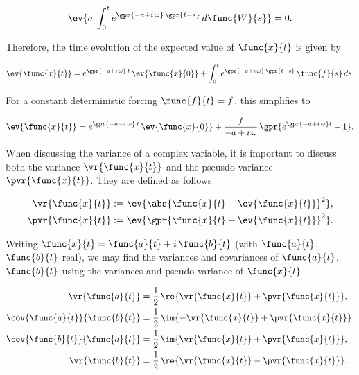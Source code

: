 \begin{equation}
	\ev{\sigma\,\int_{0}^{t} e^{\gpr{-a + i\,\omega}\,\gpr{t - s}}\,d\func{W}{s}} = 0.
\end{equation}

Therefore, the time evolution of the expected value of $\func{x}{t}$ is given by

\begin{equation}
	\ev{\func{x}{t}} = e^{\gpr{-a + i\,\omega}\,t}\,\ev{\func{x}{0}} + \int_{0}^{t} e^{\gpr{-a + i\,\omega}\,\gpr{t - s}}\,\func{f}{s}\,ds.
\end{equation}

For a constant deterministic forcing $\func{f}{t} = f$, this simplifies to

\begin{equation}
	\ev{\func{x}{t}} = e^{\gpr{-a + i\,\omega}\,t}\,\ev{\func{x}{0}} + \frac{f}{-a + i\,\omega}\,\gpr{e^{\gpr{-a + i\,\omega}t} - 1}.
\end{equation}

When discussing the variance of a complex variable, it is important to discuss both the variance $\vr{\func{x}{t}}$ and the pseusdo-variance $\pvr{\func{x}{t}}$. They are defined as follows

\begin{subequations}
	\begin{align}
		\vr{\func{x}{t}} &:= \ev{\abs{\func{x}{t} - \ev{\func{x}{t}}}^2}, \\
		\pvr{\func{x}{t}} &:= \ev{\gpr{\func{x}{t} - \ev{\func{x}{t}}}^2}.
	\end{align}
\end{subequations}

Writing $\func{x}{t} = \func{a}{t} + i\,\func{b}{t}$ (with $\func{a}{t}$, $\func{b}{t}$ real), we may find the variances and covariances of $\func{a}{t}$, $\func{b}{t}$ using the variances and pseudo-variance of $\func{x}{t}$

\begin{subequations}
	\begin{align}
		\vr{\func{a}{t}} &= \frac{1}{2}\,\re{\vr{\func{x}{t}} + \pvr{\func{x}{t}}}, \\
		\cov{\func{a}{t}}{\func{b}{t}} &= \frac{1}{2}\,\im{-\vr{\func{x}{t}} + \pvr{\func{x}{t}}}, \\
		\cov{\func{b}{t}}{\func{a}{t}} &= \frac{1}{2}\,\im{\vr{\func{x}{t}} + \pvr{\func{x}{t}}}, \\
		\vr{\func{b}{t}} &= \frac{1}{2}\,\re{\vr{\func{x}{t}} - \pvr{\func{x}{t}}}.
	\end{align}
\end{subequations}

